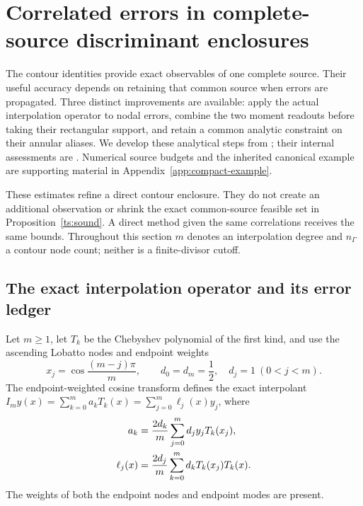 \section{Correlated errors in complete-source discriminant enclosures}
\label{sec:correlated-enclosures}

The contour identities provide exact observables of one complete source.
Their useful accuracy depends on retaining that common source when errors
are propagated. Three distinct improvements are available: apply the actual
interpolation operator to nodal errors, combine the two moment readouts
before taking their rectangular support, and retain a common analytic
constraint on their annular aliases. We develop these analytical steps
from \cite{BakerCM42,BakerCM45,BakerCM52}; their internal assessments are
\cite{BakerCMReview37,BakerCMReview39,BakerCMReview43}. Numerical source
budgets and the inherited canonical example are supporting material in
Appendix~\ref{app:compact-example}.

These estimates refine a direct contour enclosure. They do not create an
additional observation or shrink the exact common-source feasible set in
Proposition~\ref{ts:sound}. A direct method given the same correlations
receives the same bounds. Throughout this section $m$ denotes an
interpolation degree and $n_\Gamma$ a contour node count; neither is a
finite-divisor cutoff.

\subsection{The exact interpolation operator and its error ledger}

Let $m\ge1$, let $T_k$ be the Chebyshev polynomial of the first kind, and
use the ascending Lobatto nodes and endpoint weights
\begin{equation}
 x_j=\cos\frac{(m-j)\pi}{m},\qquad
 d_0=d_m=\frac12,\quad d_j=1\ (0<j<m).
 \label{ce:nodes}
\end{equation}
The endpoint-weighted cosine transform defines the exact interpolant
$I_m y(x)=\sum_{k=0}^m a_kT_k(x)=\sum_{j=0}^m\ell_j(x)y_j$, where
\begin{align}
 a_k&=\frac{2d_k}{m}\sum_{j=0}^m d_jy_jT_k(x_j),\notag\\
 \ell_j(x)&=\frac{2d_j}{m}\sum_{k=0}^m d_kT_k(x_j)T_k(x).
 \label{ce:cardinals}
\end{align}
The weights of both the endpoint nodes and endpoint modes are present.

